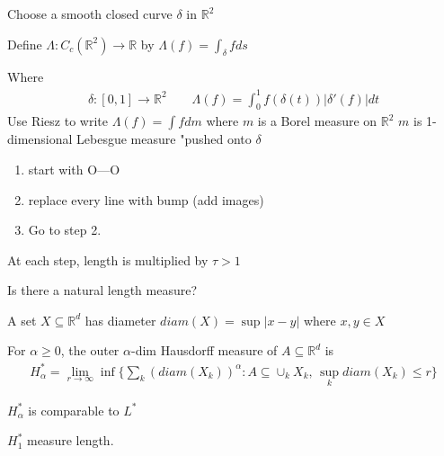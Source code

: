 \begin{definition}
	Choose a smooth closed curve $\delta$ in $\mathbb{R}^2$

	Define $\Lambda : C_c(\mathbb{R}^2) \to \mathbb{R}$ by $\Lambda (f) = \int_{\delta} f ds$

	Where 
	\begin{align*}
		\delta :[0,1] \to \mathbb{R}^2 \qquad \Lambda (f) = \int_{0}^{1} f(\delta(t)) |\delta'(f) |dt
	\end{align*} 
	Use Riesz to write $\Lambda (f) = \int f dm$  where $m$ is a Borel measure on $\mathbb{R}^2$
	$m$ is 1-dimensional Lebesgue measure "pushed onto $\delta$
\end{definition}

\begin{example}
	\begin{enumerate}
		\item start with O---O
		\item replace every line with bump (add images)
		\item Go to step 2.
	\end{enumerate}
	At each step, length is multiplied by $\tau > 1$
\end{example}
Is there a natural length measure?

\begin{definition}
	A set $X \subseteq \mathbb{R}^d$ has diameter $diam(X) = \sup|x - y |$ where $x, y \in X$
\end{definition}

\begin{definition}
	For $\alpha \geq 0$, the outer $\alpha$-dim Hausdorff measure of $A \subseteq \mathbb{R}^d$ is
	\begin{align*}
		H_{\alpha}^* = \lim_{r \to \infty} \inf\{ \sum_{k} \left(diam(X_{k}) \right)^{\alpha} : A \subseteq \cup_{k} X_k, \,
		\sup_{k} diam(X_k) \leq r \}
	\end{align*} 

	$H_{\alpha}^*$ is comparable to $L^*$ 

	$H_{1}^*$ measure length.
\end{definition}


